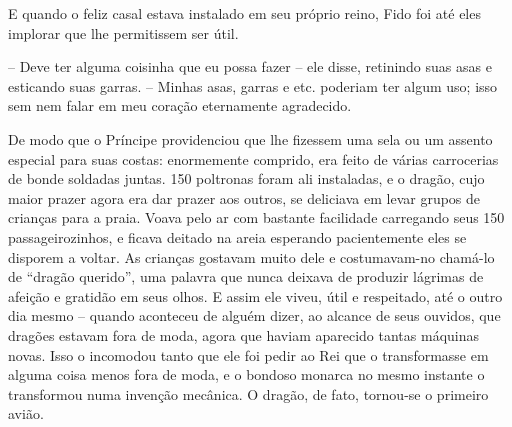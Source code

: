 E quando o feliz casal estava instalado em seu próprio reino, Fido foi
até eles implorar que lhe permitissem ser útil.

-- Deve ter alguma coisinha que eu possa fazer -- ele disse, retinindo
suas asas e esticando suas garras. -- Minhas asas, garras e etc.
poderiam ter algum uso; isso sem nem falar em meu coração eternamente
agradecido.

De modo que o Príncipe providenciou que lhe fizessem uma sela ou um
assento especial para suas costas: enormemente comprido, era feito de
várias carrocerias de bonde soldadas juntas. 150 poltronas foram ali
instaladas, e o dragão, cujo maior prazer agora era dar prazer aos
outros, se deliciava em levar grupos de crianças para a praia. Voava
pelo ar com bastante facilidade carregando seus 150 passageirozinhos,
e ficava deitado na areia esperando pacientemente eles se disporem a
voltar. As crianças gostavam muito dele e costumavam-no chamá-lo de
“dragão querido”, uma palavra que nunca deixava de produzir lágrimas
de afeição e gratidão em seus olhos. E assim ele viveu, útil e
respeitado, até o outro dia mesmo -- quando aconteceu de alguém dizer,
ao alcance de seus ouvidos, que dragões estavam fora de moda, agora
que haviam aparecido tantas máquinas novas. Isso o incomodou tanto
que ele foi pedir ao Rei que o transformasse em alguma coisa menos
fora de moda, e o bondoso monarca no mesmo instante o transformou
numa invenção mecânica. O dragão, de fato, tornou-se o primeiro
avião.

